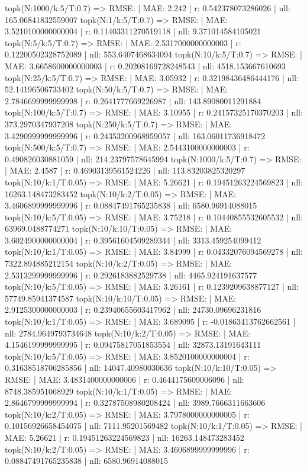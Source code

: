 topk(N:1000/k:5/T:0.7) => RMSE: | MAE: 2.242 | r: 0.542378073286026 | nll: 165.06841832559007
topk(N:1/k:5/T:0.7) => RMSE: | MAE: 3.5210100000000004 | r: 0.11403311270519118 | nll: 9.371014584105021
topk(N:5/k:5/T:0.7) => RMSE: | MAE: 2.5317000000000003 | r: 0.12200502328752089 | nll: 553.6407468634094
topk(N:10/k:5/T:0.7) => RMSE: | MAE: 3.6658600000000003 | r: 0.20208169728248543 | nll: 4518.153667610693
topk(N:25/k:5/T:0.7) => RMSE: | MAE: 3.05932 | r: 0.32198436486444176 | nll: 52.14196506733402
topk(N:50/k:5/T:0.7) => RMSE: | MAE: 2.7846699999999998 | r: 0.2641777669226987 | nll: 143.89080011291884
topk(N:100/k:5/T:0.7) => RMSE: | MAE: 3.10955 | r: 0.24157325170370203 | nll: 373.2970347937208
topk(N:250/k:5/T:0.7) => RMSE: | MAE: 3.4290999999999996 | r: 0.24353200968959057 | nll: 163.06011736918472
topk(N:500/k:5/T:0.7) => RMSE: | MAE: 2.5443100000000003 | r: 0.490826030881059 | nll: 214.23797578645994
topk(N:1000/k:5/T:0.7) => RMSE: | MAE: 2.4587 | r: 0.46903139561524226 | nll: 113.83203825320297
topk(N:10/k:1/T:0.05) => RMSE: | MAE: 5.26621 | r: 0.19451263224569823 | nll: 16263.148473283452
topk(N:10/k:2/T:0.05) => RMSE: | MAE: 3.4606899999999996 | r: 0.08847491765235838 | nll: 6580.96914088015
topk(N:10/k:5/T:0.05) => RMSE: | MAE: 3.75218 | r: 0.10440855532605532 | nll: 63969.0488774271
topk(N:10/k:10/T:0.05) => RMSE: | MAE: 3.6024900000000004 | r: 0.39561604509289344 | nll: 3313.459254099412
topk(N:10/k:1/T:0.05) => RMSE: | MAE: 3.84999 | r: 0.04332076094569278 | nll: 7322.894885212154
topk(N:10/k:2/T:0.05) => RMSE: | MAE: 2.5313299999999996 | r: 0.2926183882529738 | nll: 4465.924191637577
topk(N:10/k:5/T:0.05) => RMSE: | MAE: 3.26161 | r: 0.1239209638877127 | nll: 57749.85941374587
topk(N:10/k:10/T:0.05) => RMSE: | MAE: 2.9125300000000003 | r: 0.23940655603417962 | nll: 24730.09696231816
topk(N:10/k:1/T:0.05) => RMSE: | MAE: 3.689095 | r: -0.01863413762662561 | nll: 2784.9649793734648
topk(N:10/k:2/T:0.05) => RMSE: | MAE: 4.1546199999999995 | r: 0.09475817051853554 | nll: 32873.13191643111
topk(N:10/k:5/T:0.05) => RMSE: | MAE: 3.8520100000000004 | r: 0.31638518706285856 | nll: 14047.40980030636
topk(N:10/k:10/T:0.05) => RMSE: | MAE: 3.4831400000000006 | r: 0.4644175609006096 | nll: 8748.385951068929
topk(N:10/k:1/T:0.05) => RMSE: | MAE: 2.8646799999999994 | r: 0.32787508980208424 | nll: 3989.7666311663606
topk(N:10/k:2/T:0.05) => RMSE: | MAE: 3.7978000000000005 | r: 0.10156926658454075 | nll: 7111.95201569482
topk(N:10/k:1/T:0.05) => RMSE: | MAE: 5.26621 | r: 0.19451263224569823 | nll: 16263.148473283452
topk(N:10/k:2/T:0.05) => RMSE: | MAE: 3.4606899999999996 | r: 0.08847491765235838 | nll: 6580.96914088015
